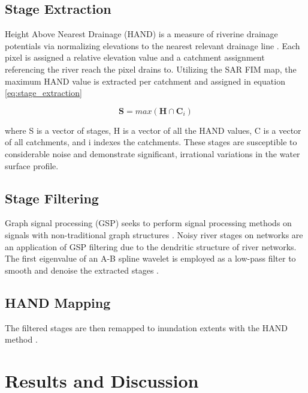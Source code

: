 \documentclass{article}
\begin{document}
\subsection{Stage Extraction}
\label{ssec:stage_extraction}

Height Above Nearest Drainage (HAND) is a measure of riverine drainage potentials via normalizing elevations to the nearest relevant drainage line \cite{renno2008hand,nobre2011height,nobre2016hand}. 
Each pixel is assigned a relative elevation value and a catchment assignment referencing the river reach the pixel drains to.
Utilizing the SAR FIM map, the maximum HAND value is extracted per catchment and assigned in equation \ref{eq:stage_extraction} 

\begin{equation}
\label{eq:stage_extraction}
\textbf{S} = max(\textbf{H} \cap \textbf{C}_i)
\end{equation}

where S is a vector of stages, H is a vector of all the HAND values, C is a vector of all catchments, and i indexes the catchments.
These stages are susceptible to considerable noise and demonstrate significant, irrational variations in the water surface profile. 

\subsection{Stage Filtering}
\label{ssec:stage_filtering}

Graph signal processing (GSP) seeks to perform signal processing methods on signals with non-traditional graph structures \cite{gavili2017shift,defferrard2017pygsp,ortega2018graph,chen2014signal}. 
Noisy river stages on networks are an application of GSP filtering due to the dendritic structure of river networks.
The first eigenvalue of an A-B spline wavelet is employed as a low-pass filter to smooth and denoise the extracted stages \cite{defferrard2017pygsp}.

\subsection{HAND Mapping}
\label{ssec:hand_mapping}

The filtered stages are then remapped to inundation extents with the HAND method \cite{renno2008hand,nobre2011height,nobre2016hand}.   

\section{Results and Discussion}
\label{sec:results_and_discussion}
\end{document}
